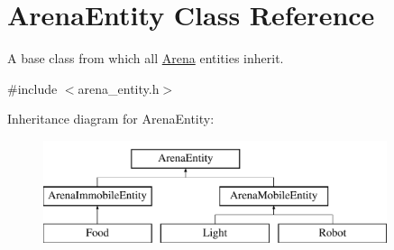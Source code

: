 \hypertarget{class_arena_entity}{}\section{Arena\+Entity Class Reference}
\label{class_arena_entity}


A base class from which all \hyperlink{class_arena}{Arena} entities inherit.  




{\ttfamily \#include $<$arena\+\_\+entity.\+h$>$}

Inheritance diagram for Arena\+Entity\+:\begin{figure}[H]
\begin{center}
\leavevmode
\includegraphics[height=3.000000cm]{class_arena_entity}
\end{center}
\end{figure}
